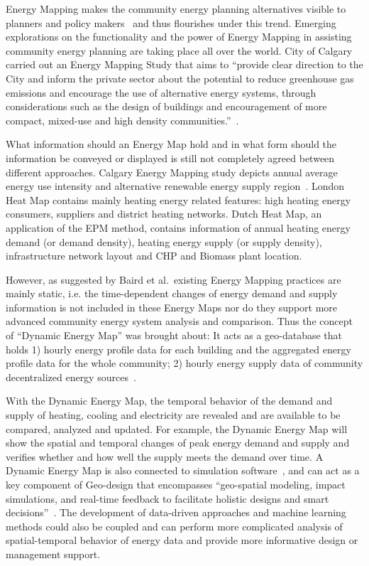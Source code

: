 \documentclass[hidelinks,12pt]{article}
\begin{document}
Energy Mapping makes the community energy planning alternatives
visible to planners and policy makers~\cite{baird2014} and thus
flourishes under this trend. Emerging explorations on the
functionality and the power of Energy Mapping in assisting community
energy planning are taking place all over the world. City of Calgary
carried out an Energy Mapping Study that aims to ``provide clear
direction to the City and inform the private sector about the
potential to reduce greenhouse gas emissions and encourage the use of
alternative energy systems, through considerations such as the design
of buildings and encouragement of more compact, mixed-use and high
density communities.''~\cite{baird2014}.  

What information should an Energy Map hold and in what form should the
information be conveyed or displayed is still not completely agreed
between different approaches. Calgary Energy Mapping study depicts
annual average energy use intensity and alternative renewable energy
supply region~\cite{aacip2009}. London Heat Map contains mainly
heating energy related features: high heating energy consumers,
suppliers and district heating networks. Dutch Heat Map, an
application of the EPM method, contains information of annual heating
energy demand (or demand density), heating energy supply (or supply
density), infrastructure network layout and CHP and Biomass plant
location.

However, as suggested by Baird et al.\ existing Energy Mapping
practices are mainly static, i.e. the time-dependent changes of energy
demand and supply information is not included in these Energy Maps nor
do they support more advanced community energy system analysis and
comparison. Thus the concept of ``Dynamic Energy Map'' was brought
about: It acts as a geo-database that holds 1) hourly energy profile
data for each building and the aggregated energy profile data for the
whole community; 2) hourly energy supply data of community
decentralized energy sources~\cite{baird2014}. 

With the Dynamic Energy Map, the temporal behavior of the demand and
supply of heating, cooling and electricity are revealed and are
available to be compared, analyzed and updated. For example, the
Dynamic Energy Map will show the spatial and temporal changes of peak
energy demand and supply and verifies whether and how well the supply
meets the demand over time. A Dynamic Energy Map is also connected to
simulation software~\cite{baird2014}, and can act as a key component
of Geo-design that encompasses ``geo-spatial modeling, impact
simulations, and real-time feedback to facilitate holistic designs and
smart decisions''~\cite{esriGeodesign2012}. The development of
data-driven approaches and machine learning methods could also be
coupled and can perform more complicated analysis of spatial-temporal
behavior of energy data and provide more informative design or
management support.
\end{document}
